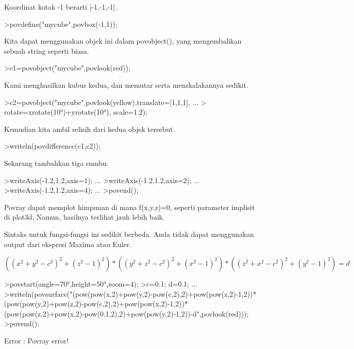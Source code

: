 \documentclass[a4paper,10pt]{article}
\begin{document}
\begin{eulernotebook}
\begin{eulercomment}
Koordinat kotak -1 berarti [-1,-1,-1].
\end{eulercomment}
\begin{eulerprompt}
>povdefine("mycube",povbox(-1,1));
\end{eulerprompt}
\begin{eulercomment}
Kita dapat menggunakan objek ini dalam povobject(), yang mengembalikan
sebuah string seperti biasa.
\end{eulercomment}
\begin{eulerprompt}
>c1=povobject("mycube",povlook(red));
\end{eulerprompt}
\begin{eulercomment}
Kami menghasilkan kubus kedua, dan memutar serta menskalakannya
sedikit.
\end{eulercomment}
\begin{eulerprompt}
>c2=povobject("mycube",povlook(yellow),translate=[1,1,1], ...
>  rotate=xrotate(10°)+yrotate(10°), scale=1.2);
\end{eulerprompt}
\begin{eulercomment}
Kemudian kita ambil selisih dari kedua objek tersebut.
\end{eulercomment}
\begin{eulerprompt}
>writeln(povdifference(c1,c2));
\end{eulerprompt}
\begin{eulercomment}
Sekarang tambahkan tiga sumbu.
\end{eulercomment}
\begin{eulerprompt}
>writeAxis(-1.2,1.2,axis=1); ...
>writeAxis(-1.2,1.2,axis=2); ...
>writeAxis(-1.2,1.2,axis=4); ...
>povend();
\end{eulerprompt}
\begin{eulercomment}
Povray dapat memplot himpunan di mana f(x,y,z)=0, seperti parameter
implisit di plot3d. Namun, hasilnya terlihat jauh lebih baik.

Sintaks untuk fungsi-fungsi ini sedikit berbeda. Anda tidak dapat
menggunakan output dari ekspresi Maxima atau Euler.

\end{eulercomment}
\begin{eulerformula}
\[
((x^2+y^2-c^2)^2+(z^2-1)^2)*((y^2+z^2-c^2)^2+(x^2-1)^2)*((z^2+x^2-c^2)^2+(y^2-1)^2)=d
\]
\end{eulerformula}
\begin{eulerprompt}
>povstart(angle=70°,height=50°,zoom=4);
>c=0.1; d=0.1; ...
>writeln(povsurface("(pow(pow(x,2)+pow(y,2)-pow(c,2),2)+pow(pow(z,2)-1,2))*(pow(pow(y,2)+pow(z,2)-pow(c,2),2)+pow(pow(x,2)-1,2))*(pow(pow(z,2)+pow(x,2)-pow(0.1,2),2)+pow(pow(y,2)-1,2))-d",povlook(red)));
>povend();
\end{eulerprompt}
\begin{euleroutput}
  Error : Povray error!
  

\end{euleroutput}
\end{eulernotebook}
\end{document}
